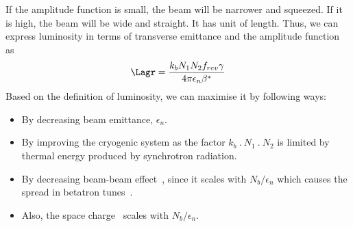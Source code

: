 If the amplitude function is small, the beam will be narrower and squeezed. If it is high, the beam will be wide and straight. It has unit of length. Thus, we can express luminosity in terms of transverse emittance and the amplitude function as
\begin{equation}\label{eq:luminosity2}
    \Lagr = \frac{k_bN_1N_2f_{rev}\gamma}{4 \pi \epsilon_n \beta^*}
\end{equation}
Based on the definition of luminosity, we can maximise it by following ways:
\begin{itemize}
    \item By decreasing beam emittance, $\epsilon_n$.
    \item By improving the cryogenic system as the factor $k_b~.~N_1~.~N_2$ is limited by thermal energy produced by synchrotron radiation.
    \item By decreasing beam-beam effect~\cite{Herr2014,Papotti2014}, since it scales with $N_b/ \epsilon_n$ which causes the spread in betatron tunes~\cite{Dubouchet2013}.
    \item Also, the space charge~\cite{Oeftiger2016} scales with $N_b/ \epsilon_n$.
\end{itemize}

